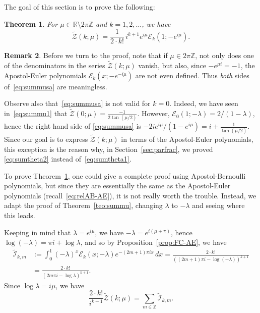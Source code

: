\documentclass[11pt, oneside]{article}
\newcommand{\Z}{\mathbb{Z}}
\newcommand{\R}{\mathbb{R}}
\newcommand{\calE}{\mathcal{E}}
\newcommand{\calI}{\mathcal{I}}
\newcommand{\calZ}{\mathcal{Z}}
\theoremstyle{plain}
\newtheorem{theorem}{Theorem}
\theoremstyle{definition}
\newtheorem{remark}[theorem]{Remark}
\begin{document}
The goal of this section is to prove the following:

\begin{theorem} 
\label{teo:summusa}
For $\mu \in \R \setminus 2\pi\Z$ and $k = 1,2,\dots$, we have
\begin{equation}
\label{eq:summusa}
  \widetilde{\calZ}(k;\mu) 
   = \frac{1}{2 \cdot k!} \, i^{k+1} e^{i\mu} \calE_{k}(1;-e^{i\mu}).
\end{equation}
\end{theorem}

\begin{remark}
Before we turn to the proof, note that if $\mu \in 2\pi\Z$, not only does one of the denominators in the series $\widetilde{\calZ}(k;\mu)$ vanish, but also, since $-e^{\mu i} = -1$, the Apostol-Euler polynomials $\calE_{k}(x;-e^{-i\mu})$ are not even defined. Thus \emph{both} sides of~\eqref{eq:summusa} are meaningless.

Observe also that~\eqref{eq:summusa} is not valid for $k=0$. Indeed, we have seen in~\eqref{eq:summu1} that $\widetilde{\calZ}(0;\mu) = \frac{-1}{2\tan(\mu/2)}$. However, $\calE_{0}(1;-\lambda) = 2/(1-\lambda)$, hence the right hand side of \eqref{eq:summusa} is
$- 2i e^{i\mu}/(1-e^{i\mu}) = i + \frac{1}{\tan(\mu/2)}$. 
Since our goal is to express $\widetilde{\calZ}(k;\mu)$ in terms of the Apostol-Euler polynomials, this exception is the reason why, in Section~\ref{sec:parfrac}, we proved \eqref{eq:sumtheta2} instead of~\eqref{eq:sumtheta1}.
\end{remark}

To prove Theorem~\ref{teo:summusa}, one could give a complete proof using Apostol-Bernoulli polynomials, but since they are essentially the same as the Apostol-Euler polynomials (recall~\eqref{eq:relAB-AE}), it is not really worth the trouble. Instead, we adapt the proof of Theorem~\ref{teo:summu}, changing $\lambda$ to $-\lambda$ and seeing where this leads.

Keeping in mind that $\lambda = e^{i\mu}$, we have $-\lambda = e^{i(\mu+\pi)}$, hence $\log(-\lambda) = \pi i + \log\lambda$, and so by Proposition~\ref{prop:FC-AE}, we have
\begin{equation}
\label{eq:FC-AEpares}
\begin{aligned}
\widetilde{\calI}_{k,m} &:= \int_0^1 (-\lambda)^x \calE_{k}(x;-\lambda)e^{-(2m+1)\pi ix}\,dx
= \frac{2 \cdot k!}{((2m+1)\pi i - \log (-\lambda))^{k+1}} \\
&= \frac{2 \cdot k!}{(2m\pi i - \log\lambda)^{k+1}}.
\end{aligned}
\end{equation}
Since $\log \lambda = i \mu$, we have
\[
  \frac{2\cdot k!}{i^{k+1}} \widetilde{\calZ}(k;\mu) =  \sum_{m\in\Z} \widetilde{\calI}_{k,m}.
\]
\end{document}

